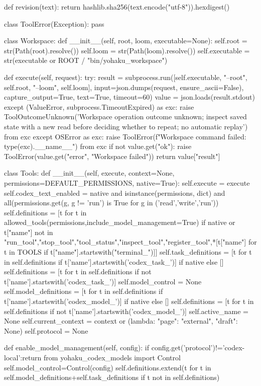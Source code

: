 def revision(text):
    return hashlib.sha256(text.encode("utf-8")).hexdigest()

class ToolError(Exception):
    pass

class Workspace:
    def __init__(self, root, loom, executable=None):
        self.root = str(Path(root).resolve())
        self.loom = str(Path(loom).resolve())
        self.executable = str(executable or ROOT / "bin/yohaku_workspace")

    def execute(self, request):
        try:
            result = subprocess.run([self.executable, "--root", self.root, "--loom", self.loom],
                input=json.dumps(request, ensure_ascii=False), capture_output=True, text=True, timeout=60)
            value = json.loads(result.stdout)
        except (ValueError, subprocess.TimeoutExpired) as exc:
            raise ToolOutcomeUnknown('Workspace operation outcome unknown; inspect saved state with a new read before deciding whether to repeat; no automatic replay') from exc
        except OSError as exc:
            raise ToolError(f"Workspace command failed: {type(exc).__name__}") from exc
        if not value.get("ok"):
            raise ToolError(value.get("error", "Workspace failed"))
        return value["result"]

class Tools:
    def __init__(self, execute, context=None, permissions=DEFAULT_PERMISSIONS, native=True):
        self.execute = execute
        self.codex_text_enabled = native and isinstance(permissions, dict) and all(permissions.get(g, g != 'run') is True for g in ('read','write','run'))
        self.definitions = [t for t in allowed_tools(permissions,include_model_management=True) if native or t["name"] not in {"run_tool","stop_tool","tool_status","inspect_tool","register_tool",*[t["name"] for t in TOOLS if t["name"].startswith("terminal_")]}]
        self.task_definitions = [t for t in self.definitions if t['name'].startswith('codex_task_')] if native else []
        self.definitions = [t for t in self.definitions if not t['name'].startswith('codex_task_')]
        self.model_control = None
        self.model_definitions = [t for t in self.definitions if t['name'].startswith('codex_model_')] if native else []
        self.definitions = [t for t in self.definitions if not t['name'].startswith('codex_model_')]
        self.active_name = None
        self.current_context = context or (lambda: {"page": "external", "draft": None})
        self.protocol = None

    def enable_model_management(self, config):
        if config.get('protocol')!='codex-local':return
        from yohaku_codex_models import Control
        self.model_control=Control(config)
        self.definitions.extend(t for t in self.model_definitions+self.task_definitions if t not in self.definitions)

